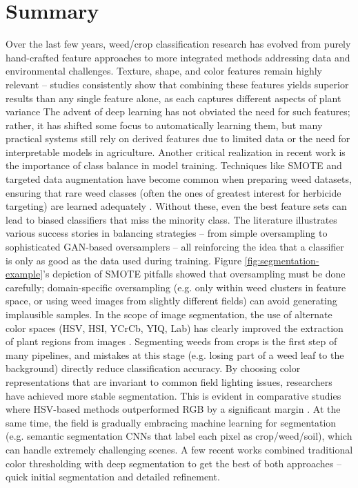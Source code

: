 \documentclass[letterpaper]{report}
\begin{document}
\section{Summary} 
Over the last few years, weed/crop classification research has evolved from purely hand-crafted feature approaches to more integrated methods addressing data and environmental challenges. Texture, shape, and color features remain highly relevant – studies consistently show that combining these features yields superior results than any single feature alone, as each captures different aspects of plant variance  The advent of deep learning has not obviated the need for such features; rather, it has shifted some focus to automatically learning them, but many practical systems still rely on derived features due to limited data or the need for interpretable models in agriculture.  
%
Another critical realization in recent work is the importance of class balance in model training. Techniques like SMOTE and targeted data augmentation have become common when preparing weed datasets, ensuring that rare weed classes (often the ones of greatest interest for herbicide targeting) are learned adequately \parencite{Ahsen2024-tr, Bazrafkan2024-bl}. Without these, even the best feature sets can lead to biased classifiers that miss the minority class. The literature illustrates various success stories in balancing strategies – from simple oversampling to sophisticated GAN-based oversamplers – all reinforcing the idea that a classifier is only as good as the data used during training. Figure  \ref{fig:segmentation-example}’s depiction of SMOTE pitfalls showed that oversampling must be done carefully; domain-specific oversampling (e.g. only within weed clusters in feature space, or using weed images from slightly different fields) can avoid generating implausible samples.  
%
In the scope of image segmentation, the use of alternate color spaces (HSV, HSI, YCrCb, YIQ, Lab) has clearly improved the extraction of plant regions from images  \parencite{Wu2021-gt}. Segmenting weeds from crops is the first step of many pipelines, and mistakes at this stage (e.g. losing part of a weed leaf to the background) directly reduce classification accuracy. By choosing color representations that are invariant to common field lighting issues, researchers have achieved more stable segmentation. This is evident in comparative studies where HSV-based methods outperformed RGB by a significant margin \parencite{Priya2019-zw}. At the same time, the field is gradually embracing machine learning for segmentation (e.g. semantic segmentation CNNs that label each pixel as crop/weed/soil), which can handle extremely challenging scenes. A few recent works combined traditional color thresholding with deep segmentation to get the best of both approaches – quick initial segmentation and detailed refinement.  
\end{document}

